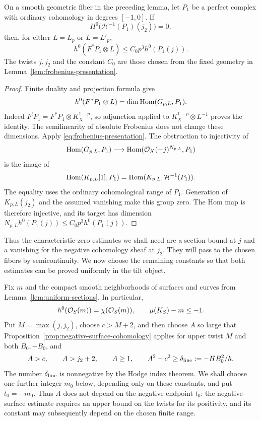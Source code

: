 \begin{corollary}
\label{cor:frobenius-section-transfer}
On a smooth geometric fiber in the preceding lemma, let $P_1$ be a
perfect complex with ordinary cohomology in degrees $[-1,0]$.
If
\[
 H^0\bigl(\mathcal H^{-1}(P_1)(j_2)\bigr)=0,
\]
then, for either $L=L_p$ or $L=L'_p$,
\begin{equation}\label{eq:frobenius-section-transfer}
 h^0(F^*P_1\otimes L)
 \leq C_0p^3h^0(P_1(j)).
\end{equation}
The twists $j,j_2$ and the constant $C_0$ are those chosen from the
fixed geometry in Lemma~\ref{lem:frobenius-presentation}.
\end{corollary}

\begin{proof}
Finite duality and projection formula give
\begin{equation}\label{eq:frobenius-hom-identity}
 h^0(F^*P_1\otimes L)=\dim\operatorname{Hom}(G_{p,L},P_1).
\end{equation}
Indeed $F^!P_1=F^*P_1\otimes K_X^{1-p}$, so adjunction applied
to $K_X^{1-p}\otimes L^{-1}$ proves the identity.
The semilinearity of absolute Frobenius does not change these
dimensions.  Apply \eqref{eq:frobenius-presentation}.  The obstruction
to injectivity of
\[
 \operatorname{Hom}(G_{p,L},P_1)\longrightarrow
 \operatorname{Hom}(\mathcal O_X(-j)^{N_{p,L}},P_1)
\]
is the image of
\[
 \operatorname{Hom}(K_{p,L}[1],P_1)
 =\operatorname{Hom}(K_{p,L},\mathcal H^{-1}(P_1)).
\]
The equality uses the ordinary cohomological range of $P_1$.
Generation of $K_{p,L}(j_2)$ and the assumed vanishing make this
group zero.  The Hom map is therefore injective, and its target
has dimension $N_{p,L}h^0(P_1(j))\leq C_0p^3h^0(P_1(j))$.
\end{proof}

Thus the characteristic-zero estimates we shall need are a section
bound at $j$ and a vanishing for the negative cohomology sheaf at
$j_2$.  They will pass to the chosen fibers by semicontinuity.
We now choose the remaining constants so that both estimates can
be proved uniformly in the tilt object.

Fix $m$ and the compact smooth neighborhoods of surfaces and curves
from Lemma~\ref{lem:uniform-sections}.  In particular,
\begin{equation}\label{eq:apex-m-choice}
 h^0(\mathcal O_S(m))=\chi(\mathcal O_S(m)),\qquad
 \mu(K_S)-m\leq-1.
\end{equation}
Put $M=\max(j,j_2)$, choose $c>M+2$, and then choose $A$ so large that
Proposition~\ref{prop:negative-surface-cohomology} applies for upper
twist $M$ and both $B_0,-B_0$, and
\begin{equation}\label{eq:apex-A-choice}
 A>c,\qquad A>j_2+2,\qquad A\geq1,\qquad
 A^2-c^2\geq\delta_{\rm line}:=-HB_0^2/h.
\end{equation}
The number $\delta_{\rm line}$ is nonnegative by the Hodge index
theorem.  We shall choose one further integer $m_0$ below, depending
only on these constants, and put $t_0=-m_0$.  Thus $A$ does not
depend on the negative endpoint $t_0$: the negative-surface estimate
requires an upper bound on the twists for its positivity, and its
constant may subsequently depend on the chosen finite range.

